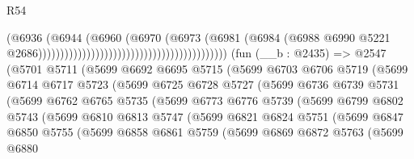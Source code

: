 \begin{lexlean}{R54}
\begin{coremodule}
                                                                          (@6936
                                                                            (@6944
                                                                              (@6960
                                                                                (@6970
                                                                                  (@6973
                                                                                    (@6981
                                                                                      (@6984
                                                                                        (@6988
                                                                                          @6990
                                                                                          @5221
                                                                                          @2686)))))))))))))))))))))))))))))))))))))))))))
    (fun (__b : @2435) =>
    @2547
      (@5701
        @5711
        (@5699
          @6692
          @6695
          @5715
          (@5699
            @6703
            @6706
            @5719
            (@5699
              @6714
              @6717
              @5723
              (@5699
                @6725
                @6728
                @5727
                (@5699
                  @6736
                  @6739
                  @5731
                  (@5699
                    @6762
                    @6765
                    @5735
                    (@5699
                      @6773
                      @6776
                      @5739
                      (@5699
                        @6799
                        @6802
                        @5743
                        (@5699
                          @6810
                          @6813
                          @5747
                          (@5699
                            @6821
                            @6824
                            @5751
                            (@5699
                              @6847
                              @6850
                              @5755
                              (@5699
                                @6858
                                @6861
                                @5759
                                (@5699
                                  @6869
                                  @6872
                                  @5763
                                  (@5699
                                    @6880

\end{coremodule}
\end{lexlean}
